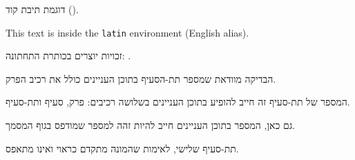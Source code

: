 \documentclass{hebrew-academic-template}
\begin{document}
\begin{codebox}
דוגמת תיבת קוד ().
\end{codebox}

\begin{latin}
This text is inside the \texttt{latin} environment (English alias).
\end{latin}

זכויות יוצרים בכותרת התחתונה: .

%

הבדיקה מוודאת שמספר תת-הסעיף בתוכן העניינים כולל את רכיב הפרק.

המספר של תת-סעיף זה חייב להופיע בתוכן העניינים בשלושה רכיבים: פרק, סעיף ותת-סעיף.

גם כאן, המספר בתוכן העניינים חייב להיות זהה למספר שמודפס בגוף המסמך.

תת-סעיף שלישי, לאימות שהמונה מתקדם כראוי ואינו מתאפס.

%
\end{document}
